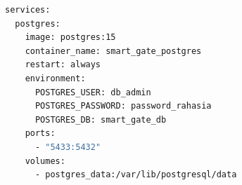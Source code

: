 \begin{minipage}{\textwidth}
\begin{lstlisting}[language=bash, caption={Konfigurasi Layanan Basis Data pada \texttt{docker-compose.yml}}, label={lst:docker_config}, frame=single, captionpos=t]
services:
  postgres:
    image: postgres:15
    container_name: smart_gate_postgres
    restart: always
    environment:
      POSTGRES_USER: db_admin
      POSTGRES_PASSWORD: password_rahasia
      POSTGRES_DB: smart_gate_db
    ports:
      - "5433:5432"
    volumes:
      - postgres_data:/var/lib/postgresql/data
\end{lstlisting}
\end{minipage}